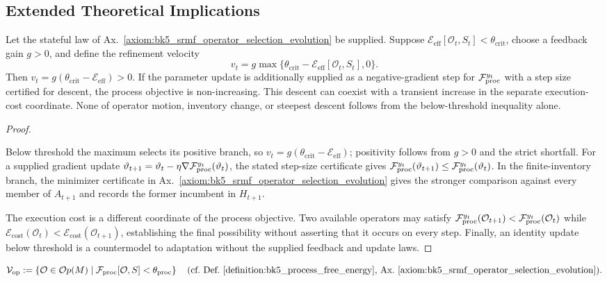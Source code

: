 \subsection{Extended Theoretical Implications}
\label{subsec:bk5_extended_theoretical_implications}
\begin{theorem} \label{theorem:bk5__srmf_operator_adaptation}
Let the stateful law of Ax.~\ref{axiom:bk5_srmf_operator_selection_evolution}
be supplied. Suppose
$\mathcal E_{\mathrm{eff}}[\mathcal O_t,S_t]<\theta_{\mathrm{crit}}$, choose a
feedback gain $g>0$, and define the refinement velocity
\[
 v_t=g\max\{\theta_{\mathrm{crit}}-
 \mathcal E_{\mathrm{eff}}[\mathcal O_t,S_t],0\}.
\]
Then $v_t=g(\theta_{\mathrm{crit}}-\mathcal E_{\mathrm{eff}})>0$. If the
parameter update is additionally supplied as a negative-gradient step for
$\mathcal{F}_{\text{proc}}^{y_t}$ with a step size certified for descent, the process objective
is non-increasing. This descent can coexist with a transient increase in the
separate execution-cost coordinate. None of operator motion, inventory change,
or steepest descent follows from the below-threshold inequality alone.
\end{theorem}
\begin{proof}
\label{proof:bk5__srmf_operator_adaptation}
\leavevmode

Below threshold the maximum selects its positive branch, so
$v_t=g(\theta_{\mathrm{crit}}-\mathcal E_{\mathrm{eff}})$; positivity follows
from $g>0$ and the strict shortfall.  For a supplied gradient update
$\vartheta_{t+1}=\vartheta_t-\eta\nabla\mathcal{F}_{\text{proc}}^{y_t}(\vartheta_t)$, the stated
step-size certificate gives
$\mathcal{F}_{\text{proc}}^{y_t}(\vartheta_{t+1})\le
\mathcal{F}_{\text{proc}}^{y_t}(\vartheta_t)$.  In the finite-inventory branch, the minimizer
certificate in Ax.~\ref{axiom:bk5_srmf_operator_selection_evolution} gives the
stronger comparison against every member of $A_{t+1}$ and records the former
incumbent in $H_{t+1}$.

The execution cost is a different coordinate of the process objective.  Two
available operators may satisfy
$\mathcal{F}_{\text{proc}}^{y_t}(\mathcal O_{t+1})<\mathcal{F}_{\text{proc}}^{y_t}(\mathcal O_t)$ while
$\mathcal E_{\mathrm{cost}}(\mathcal O_t)<
\mathcal E_{\mathrm{cost}}(\mathcal O_{t+1})$, establishing the final
possibility without asserting that it occurs on every step.  Finally, an
identity update below threshold is a countermodel to adaptation without the
supplied feedback and update laws.
\end{proof}
\begin{definition} \label{definition:bk5__operator_viability_set_v}

\[
\mathcal{V}_{\text{op}} := \left\{ \mathcal{O} \in \mathcal{O}p(M) \mid \mathcal{F}_{\text{proc}}[\mathcal{O}, S] < \theta_{\text{proc}} \right\} \quad \text{(cf.~Def.~\ref{definition:bk5_process_free_energy}, Ax.~\ref{axiom:bk5_srmf_operator_selection_evolution})}.
\]
\end{definition}
